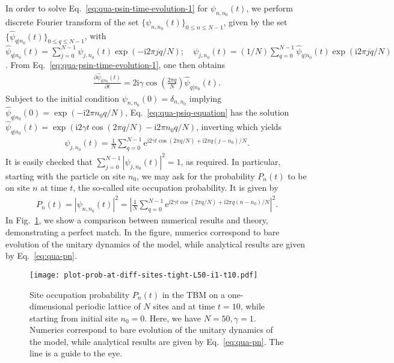 \documentclass[12pt]{iopart}
\newcommand{\ee}{\mathrm{e}}
\newcommand{\ii}{\mathrm{i}}
\begin{document}
In order to solve Eq.~\eqref{eq:qua-psin-time-evolution-1} for $\psi_{n,n_0}(t)$, we perform
discrete Fourier transform of the set $\{\psi_{n,n_0}(t)\}_{0 \le n \le N-1}$, given by the set
$\{\widehat{\psi}_{q|n_0}(t)\}_{ 0 \le q \le N-1}$, with
$\widehat{\psi}_{q|n_0}(t)=\sum_{j=0}^{N-1}\psi_{j,n_0}(t) \exp(-\ii 2\pi
jq/N); \quad
\psi_{j,n_0}(t)=(1/N)\sum_{q=0}^{N-1}\widehat{\psi}_{q|n_0}(t)\exp(\ii 2\pi
jq/N)$. From Eq.~\eqref{eq:qua-psin-time-evolution-1}, one then obtains
\begin{align}
\frac{\partial \widehat{\psi}_{q|n_0}(t)}{\partial
t}=2\ii\gamma\cos\left(\frac{2\pi
q}{N}\right)\widehat{\psi}_{q|n_0}(t).
\label{eq:qua-psiq-equation}
\end{align}
Subject to the initial condition $\psi_{n,n_0}(0)=\delta_{n,n_0}$
implying $\widehat{\psi}_{q|n_0}(0)=\exp(-\ii 2\pi
        n_0q/N)$, Eq.~\eqref{eq:qua-psiq-equation} has the solution
        $\widehat{\psi}_{q|n_0}(t)=\exp(\ii 2 \gamma t \cos (2\pi
        q/N)-\ii 2\pi n_0 q/N)$,
inverting which yields
\begin{align}
\psi_{j,n_0}(t)=\frac{1}{N}\sum_{q=0}^{N-1}\ee^{\ii 2\gamma t \cos (2\pi q/N)+\ii 2\pi
        q(j-n_0)/N}.
        \label{eq:qua-solution-psij}
\end{align}
It is easily checked that $\sum_{j=0}^{N-1}|\psi_{j,n_0}(t)|^2=1$, as
required. In particular, starting with the particle on site $n_0$, we may ask for
the probability $P_n(t)$ to be on site $n$ at time $t$, the so-called site
occupation probability. It is given by
\begin{align}
        P_n(t)=|\psi_{n,n_0}(t)|^2=\left|\frac{1}{N}\sum_{q=0}^{N-1} \ee^{\ii 2 \gamma t \cos (2\pi q/N)+\ii 2\pi
        q(n-n_0)/N}\right|^2.
\label{eq:qua-pn}
\end{align}
In Fig.~\ref{fig:qua-tbm-site-probability}, we show a comparison between
numerical results and theory, demonstrating a perfect match.
In the figure, numerics
correspond to bare evolution of the unitary dynamics of the model, while
analytical results are given by Eq.~\eqref{eq:qua-pn}.

\begin{figure}[!htbp]
\centering
\texttt{[image: plot-prob-at-diff-sites-tight-L50-i1-t10.pdf]}
        \caption{Site occupation probability $P_n(t)$ in the TBM on
a one-dimensional periodic lattice of $N$ sites and at time $t=10$, while starting
from initial site $n_0=0$. Here, we have 
$N=50, \gamma=1$. Numerics
correspond to bare evolution of the unitary dynamics of the model, while
analytical results are given by Eq.~\eqref{eq:qua-pn}. The line is a guide to the eye.}
\label{fig:qua-tbm-site-probability}
\end{figure}
\end{document}
